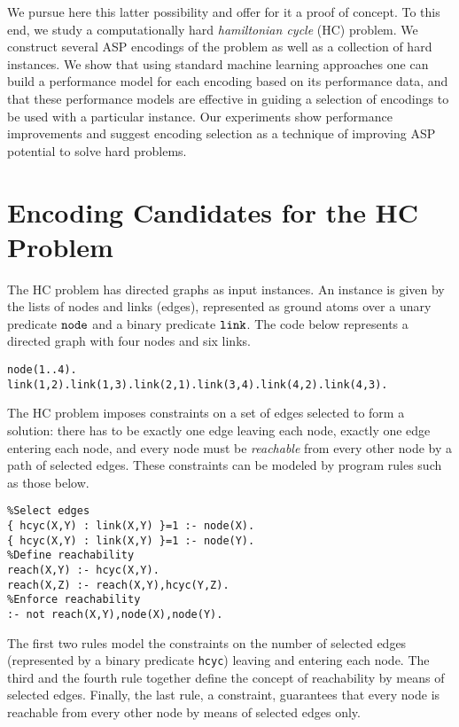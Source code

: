 \documentclass[submission,copyright,creativecommons]{eptcs}
\begin{document}
We pursue here this latter possibility and offer for it a proof of concept.
To this end, we study a computationally hard \emph{hamiltonian cycle} 
(HC) problem. We construct several ASP encodings of 
the problem as well as a collection of hard instances. We show that using 
standard machine learning approaches one can build a performance model for
each encoding based on its performance data, and that these performance models 
are effective in guiding a selection of encodings to be used with a particular 
instance. Our experiments show performance improvements and suggest encoding 
selection as a technique of improving ASP potential to solve hard problems.


\section{Encoding Candidates for the HC Problem}
%
The HC problem has directed graphs as input instances. An instance is given 
by the lists of nodes and links (edges), represented as ground atoms over 
a unary predicate $\tt{node}$ and a binary predicate $\tt{link}$. The code 
below represents a directed graph with four nodes and six links.
{\footnotesize \tt{
\begin{lstlisting}
node(1..4).
link(1,2).link(1,3).link(2,1).link(3,4).link(4,2).link(4,3).
\end{lstlisting}}}

The HC problem imposes constraints on a set of edges selected to form a 
solution: there has to be exactly one edge leaving each node, exactly one edge
entering each node, and every node must be \emph{reachable} from every other 
node by a path of selected edges. These constraints can be modeled by program
rules such as those below. 
{\footnotesize \tt{
\begin{lstlisting}
%Select edges
{ hcyc(X,Y) : link(X,Y) }=1 :- node(X).
{ hcyc(X,Y) : link(X,Y) }=1 :- node(Y).
%Define reachability
reach(X,Y) :- hcyc(X,Y).
reach(X,Z) :- reach(X,Y),hcyc(Y,Z).
%Enforce reachability
:- not reach(X,Y),node(X),node(Y).
\end{lstlisting}}}

The first two rules model the constraints on the number of selected edges 
(represented by a binary predicate {\tt hcyc}) leaving and entering each node. 
The third and the fourth rule together define the concept of reachability by 
means of selected edges. Finally, the last rule, a constraint, guarantees that
every node is reachable from every other node by means of selected edges only.
\end{document}
